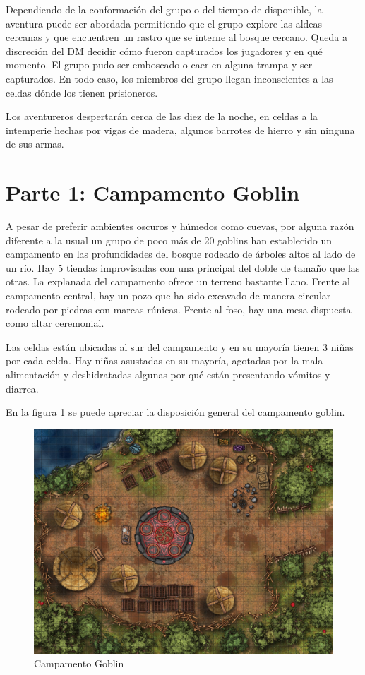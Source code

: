 \documentclass[10pt,twoside,twocolumn,openany]{dndbook}
\begin{document}
Dependiendo de la conformación del grupo o del tiempo de disponible, la aventura puede ser abordada
permitiendo que el grupo explore las aldeas cercanas y que encuentren un rastro que se interne al 
bosque cercano. Queda a discreción del DM decidir cómo fueron capturados los jugadores y en qué 
momento. El grupo pudo ser emboscado o caer en alguna trampa y ser capturados. En todo caso,
los miembros del grupo llegan inconscientes a las celdas dónde los tienen prisioneros.

Los aventureros despertarán cerca de las diez de la noche, en celdas a la intemperie hechas por vigas de 
madera, algunos barrotes de hierro y sin ninguna de sus armas.


\section{Parte 1: Campamento Goblin}

A pesar de preferir ambientes oscuros y húmedos como cuevas, por alguna razón diferente a la usual 
un grupo de poco más de 20 goblins han establecido un campamento en las profundidades del bosque rodeado de 
árboles altos al lado de un río. Hay 5 tiendas improvisadas con una principal del doble de tamaño que 
las otras. La explanada del campamento ofrece un terreno bastante llano. Frente al campamento central, 
hay un pozo que ha sido excavado de manera circular rodeado por piedras con marcas rúnicas. 
Frente al foso, hay una mesa dispuesta como altar ceremonial.

Las celdas están ubicadas al sur del campamento y en su mayoría tienen 3 niñas por cada celda. Hay 
niñas asustadas en su mayoría, agotadas por la mala alimentación y deshidratadas algunas por qué 
están presentando vómitos y diarrea.

En la figura \ref{fig:camp1} se puede apreciar la disposición general del campamento goblin.

\begin{figure}[hb!]
  \centering
  \includegraphics[width=\textwidth]{maps/goblin-camp.jpg}
  \caption{Campamento Goblin}
  \label{fig:camp1}
\end{figure}
\end{document}
